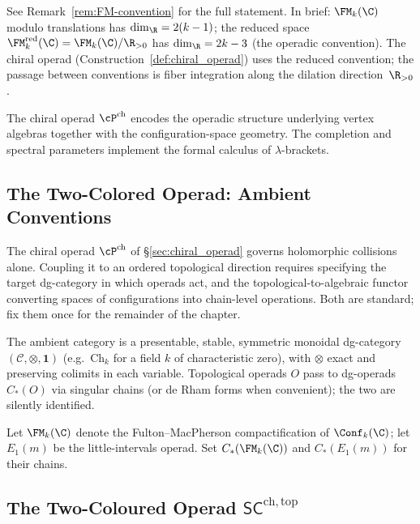 \begin{remark}
\label{rem:FM-dimension-conventions}
See Remark~\ref{rem:FM-convention} for the full statement.
In brief: $\FM_k(\C)$ modulo translations has $\dim_\R = 2(k-1)$;
the reduced space $\FM_k^{\mathrm{red}}(\C) = \FM_k(\C)/\R_{>0}$
has $\dim_\R = 2k-3$ (the operadic convention).
The chiral operad (Construction~\ref{def:chiral_operad}) uses
the reduced convention; the passage between conventions is fiber
integration along the dilation direction~$\R_{>0}$.
\end{remark}

\begin{remark}
The chiral operad $\cP^{\mathrm{ch}}$ encodes the operadic
structure underlying vertex algebras together with the configuration-space
geometry. The completion and spectral parameters implement the formal
calculus of $\lambda$-brackets.
\end{remark}

\subsection{The Two-Colored Operad: Ambient Conventions}
\label{sec:SC-operad-foundations}

The chiral operad $\cP^{\mathrm{ch}}$ of
\S\ref{sec:chiral_operad} governs holomorphic collisions alone.
Coupling it to an ordered topological direction requires specifying
the target dg-category in which operads act, and the
topological-to-algebraic functor converting spaces of configurations
into chain-level operations. Both are standard; fix them once for
the remainder of the chapter.

The ambient category is a presentable, stable, symmetric monoidal
dg-category $(\mathcal C,\otimes,\mathbf 1)$ (e.g.\ $\mathrm{Ch}_k$
for a field $k$ of characteristic zero), with $\otimes$ exact and
preserving colimits in each variable. Topological operads $O$ pass
to dg-operads $C_\ast(O)$ via singular chains (or de Rham forms when
convenient); the two are silently identified.

\begin{notation}
\label{not:fm-e1}
Let $\FM_k(\C)$ denote the Fulton--MacPherson compactification of $\Conf_k(\C)$; let $E_1(m)$ be the little-intervals operad. Set $C_\ast(\FM_k(\C))$ and $C_\ast(E_1(m))$ for their chains.
\end{notation}

\subsection{The Two-Coloured Operad $\mathsf{SC}^{\mathrm{ch,top}}$}
\label{subsec:sc-def}

